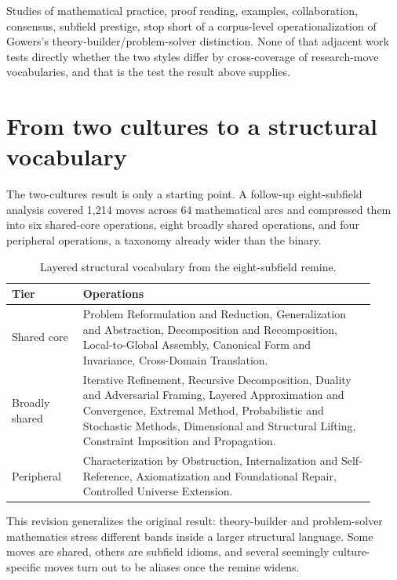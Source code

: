 \documentclass[11pt]{article}
\begin{document}
Studies of mathematical practice, proof reading, examples, collaboration,
consensus, subfield prestige, %
\citep{cranshaw2011polymath,gargiulo2022polymath,weber2014proofreading,lockwood2016examples,mejia2021explanatory,wagner2022consensus,schlenker2020prestige}
stop short of a corpus-level operationalization of Gowers's
theory-builder/problem-solver distinction. None of that adjacent work tests
directly whether the two styles differ by cross-coverage of research-move
vocabularies, and that is the test the result above supplies.

\section{From two cultures to a structural vocabulary}

The two-cultures result is only a starting point. A follow-up eight-subfield
analysis covered 1,214 moves across 64 mathematical arcs and compressed them into
six shared-core operations, eight broadly shared operations, and four peripheral
operations, a taxonomy already wider than the binary.

\begin{table}[ht]
\centering
\caption{Layered structural vocabulary from the eight-subfield remine.}
\label{tab:structural-vocabulary}
\begin{tabular}{p{0.18\linewidth}p{0.74\linewidth}}
\toprule
Tier & Operations \\
\midrule
Shared core & Problem Reformulation and Reduction, Generalization and Abstraction, Decomposition and Recomposition, Local-to-Global Assembly, Canonical Form and Invariance, Cross-Domain Translation. \\
Broadly shared & Iterative Refinement, Recursive Decomposition, Duality and Adversarial Framing, Layered Approximation and Convergence, Extremal Method, Probabilistic and Stochastic Methods, Dimensional and Structural Lifting, Constraint Imposition and Propagation. \\
Peripheral & Characterization by Obstruction, Internalization and Self-Reference, Axiomatization and Foundational Repair, Controlled Universe Extension. \\
\bottomrule
\end{tabular}
\end{table}

This revision generalizes the original result: theory-builder and problem-solver
mathematics stress different bands inside a larger structural language. Some moves
are shared, others are subfield idioms, and several seemingly culture-specific
moves turn out to be aliases once the remine widens.
\end{document}
